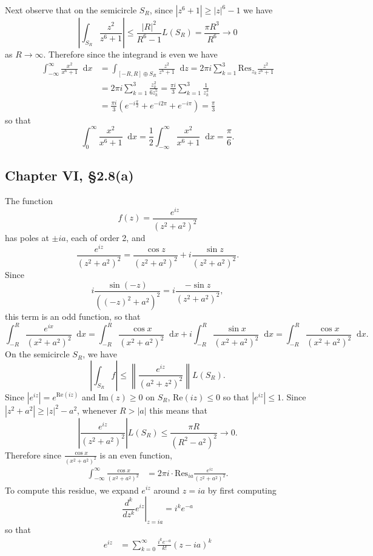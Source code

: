 \documentclass{article}
\newcommand\Res{\mathrm{Res}}
\renewcommand\Im{\mathrm{Im}}
\renewcommand\Re{\mathrm{Re}}
\newcommand\dif{\mathop{}\!\mathrm{d}}
\begin{document}
\begin{enumerate}[(a)]
{    Next observe that on the semicircle $S_R$,
    since $|z^6 + 1| \geq |z|^6 - 1$ we have
    $$
         \left|
           \int_{S_R}
             \frac{z^2}{z^6 + 1}
         \right|
    \leq \frac{|R|^2}{R^6 - 1}  L(S_R)
    =    \frac{\pi R^3}{R^6}
    \to  0
    $$
    as $R \to \infty$. Therefore since the integrand
    is even we have
    \begin{align*}
        \int_{-\infty}^\infty
          \frac{x^2}{x^6 + 1}
          \dif x
     &= \int_{[-R, R] \oplus S_R}
          \frac{z^2}{z^6 + 1}
          \dif z
      = 2 \pi i
        \sum_{k=1}^3
          \Res_{z_k} \frac{z^2}{z^6 + 1} \\
     &= 2 \pi i
         \sum_{k=1}^3
           \frac{z_k^2}{6z_k^5}
      = \frac{\pi i}{3}
          \sum_{k=1}^3
            \frac{1}{z_k^{3}} \\
     &= \frac{\pi i}{3}
          ( e^{-i \frac{\pi}{2}}
          + e^{-i 2 \pi}
          + e^{-i \pi})
      = \frac{\pi}{3}
    \end{align*}
    so that
    $$
      \int_{0}^\infty \frac{x^2}{x^6 + 1} \dif x
    = \frac{1}{2}\int_{-\infty}^\infty \frac{x^2}{x^6 + 1} \dif x
    = \frac{\pi}{6}.
    $$
  }
\end{enumerate}

\subsection*{Chapter VI, \S 2.8(a)}
The function
$$
f(z) = \frac{e^{iz}}{(z^2 + a^2)^2}
$$
has poles at $\pm i a$, each of order 2, and
$$
  \frac{e^{iz}}{(z^2 + a^2)^2}
= \frac{\cos z}{(z^2 + a^2)^2}
+ i \frac{\sin z}{(z^2 + a^2)^2}.
$$
Since
$$
  i\frac{\sin (-z)}{((-z)^2 + a^2)^2}
= i\frac{-\sin z}{(z^2 + a^2)^2},
$$
this term is an odd function, so that
$$
  \int_{-R}^R
    \frac{e^{ix}}{(x^2 + a^2)^2}
    \dif x
= \int_{-R}^R
    \frac{\cos x}{(x^2 + a^2)^2}
    \dif x
+ i \int_{-R}^R
    \frac{\sin x}{(x^2 + a^2)^2}
    \dif x
= \int_{-R}^R
    \frac{\cos x}{(x^2 + a^2)^2}
    \dif x.
$$
On the semicircle $S_R$, we have
$$
     \left|
       \int_{S_R} f
     \right|
\leq \left\|
       \frac{e^{iz}}
            {(a^2 + z^2)^2}
     \right\|
     L(S_R).
$$
Since $|e^{iz}| = e^{\Re(iz)}$ and
$\Im(z) \geq 0$ on $S_R$,
$\Re(iz) \leq 0$ so that $|e^{iz}| \leq 1$.
Since $|z^2 + a^2| \geq |z|^2 - a^2$, whenever
$R > |a|$ this means that
$$
     \left|
       \frac{e^{iz}}
            {(z^2 + a^2)^2}
     \right| L(S_R)
\leq \frac{\pi R}{(R^2 - a^2)^2}
\to  0.
$$
Therefore since $\frac{\cos x}{(x^2 + a^2)^2}$ is an
even function,
\begin{align*}
    \int_{-\infty}^\infty
      \frac{\cos x}
           {(x^2 + a^2)^2}
&= 2 \pi i \cdot
   \Res_{ia} \frac{e^{iz}}{(z^2 + a^2)^2}.
\end{align*}
To compute this residue, we expand $e^{iz}$ around $z = ia$
by first computing
$$
  \left.\frac{d^k}{dz^k} e^{iz}\right|_{z = ia}
= i^k e^{-a}
$$
so that
\begin{align*}
  e^{iz}
&= \sum_{k=0}^\infty
     \frac{i^k e^{-a}}{k!}
     (z - ia)^k
\end{align*}
\end{document}
